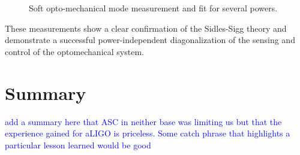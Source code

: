 \begin{figure}
\begin{centering}
\caption{Soft opto-mechanical mode measurement and fit for several
 powers.}
\label{fig:softTF}
\end{centering}
\end{figure}

These measurements show a clear confirmation of the Sidles-Sigg theory
and demonstrate a successful power-independent diagonalization of the
sensing and control of the optomechanical system.



\section{Summary}
\textcolor{blue}{add a summary here that ASC in
  neither base was limiting us but that the experience gained for
  aLIGO is priceless. Some catch phrase that highlights a particular
  lesson learned would be good}



